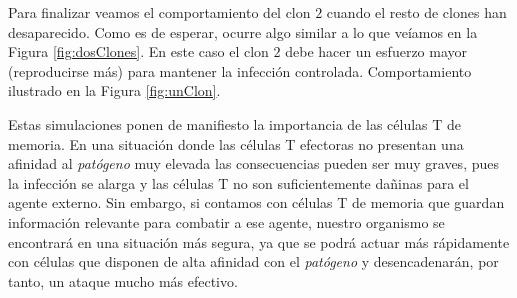 Para finalizar veamos el comportamiento del clon $2$ cuando el resto de clones han desaparecido. Como es de esperar, ocurre algo similar a lo que veíamos en la Figura \ref{fig:dosClones}. En este caso el clon $2$ debe hacer un esfuerzo mayor (reproducirse más) para mantener la infección controlada. Comportamiento ilustrado en la Figura \ref{fig:unClon}.

Estas simulaciones ponen de manifiesto la importancia de las células T de memoria. En una situación donde las células T efectoras no presentan una afinidad al \textit{patógeno} muy elevada las consecuencias pueden ser muy graves, pues la infección se alarga y las células T no son suficientemente dañinas para el agente externo. Sin embargo, si contamos con células T de memoria que guardan información relevante para combatir a ese agente, nuestro organismo se encontrará en una situación más segura, ya que se podrá actuar más rápidamente con células que disponen de alta afinidad con el \textit{patógeno} y desencadenarán, por tanto, un ataque mucho más efectivo.



